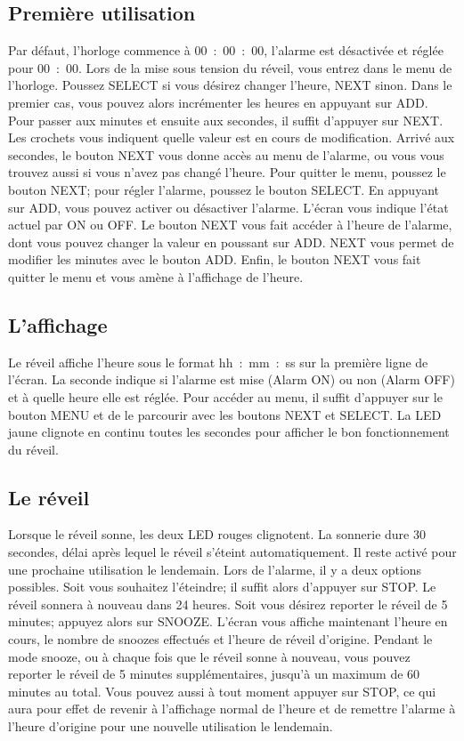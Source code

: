 \documentclass[12pt,a4paper]{article}
\begin{document}
\subsection{Première utilisation}
Par défaut, l'horloge commence à 00~:~00~:~00, l'alarme est désactivée et réglée pour 00~:~00.
Lors de la mise sous tension du réveil, vous entrez dans le menu de l'horloge.
Poussez SELECT si vous désirez changer l'heure, NEXT sinon.
Dans le premier cas, vous pouvez alors incrémenter les heures en appuyant sur ADD. Pour passer aux minutes et ensuite aux secondes, il suffit d'appuyer sur NEXT. Les crochets vous indiquent quelle valeur est en cours de modification.
Arrivé aux secondes, le bouton NEXT vous donne accès au menu de l'alarme, ou vous vous trouvez aussi si vous n'avez pas changé l'heure. Pour quitter le menu, poussez le bouton NEXT; pour régler l'alarme, poussez le bouton SELECT. En appuyant sur ADD, vous pouvez activer ou désactiver l'alarme. L'écran vous indique l'état actuel par ON ou OFF. Le bouton NEXT vous fait accéder à l'heure de l'alarme, dont vous pouvez changer la valeur en poussant sur ADD. NEXT vous permet de modifier les minutes avec le bouton ADD. Enfin, le bouton NEXT vous fait quitter le menu et vous amène à l'affichage de l'heure.

\subsection{L'affichage}
Le réveil affiche l'heure sous le format hh~:~mm~:~ss sur la première ligne de l'écran. La seconde indique si l'alarme est mise (Alarm ON) ou non (Alarm OFF) et à quelle heure elle est réglée. Pour accéder au menu, il suffit d'appuyer sur le bouton MENU et de le parcourir avec les boutons NEXT et SELECT. La LED jaune clignote en continu toutes les secondes pour afficher le bon fonctionnement du réveil.

\subsection{Le réveil}
Lorsque le réveil sonne, les deux LED rouges clignotent. La sonnerie dure 30 secondes, délai après lequel le réveil s'éteint automatiquement. Il reste activé pour une prochaine utilisation le lendemain.
Lors de l'alarme, il y a deux options possibles. Soit vous souhaitez l'éteindre; il suffit alors d'appuyer sur STOP. Le réveil sonnera à nouveau dans 24 heures. Soit vous désirez reporter le réveil de 5 minutes; appuyez alors sur SNOOZE. L'écran vous affiche maintenant l'heure en cours, le nombre de snoozes effectués et l'heure de réveil d'origine. Pendant le mode snooze, ou à chaque fois que le réveil sonne à nouveau, vous pouvez reporter le réveil de 5 minutes supplémentaires, jusqu'à un maximum de 60 minutes au total. Vous pouvez aussi à tout moment appuyer sur STOP, ce qui aura pour effet de revenir à l'affichage normal de l'heure et de remettre l'alarme à l'heure d'origine pour une nouvelle utilisation le lendemain.
\end{document}
